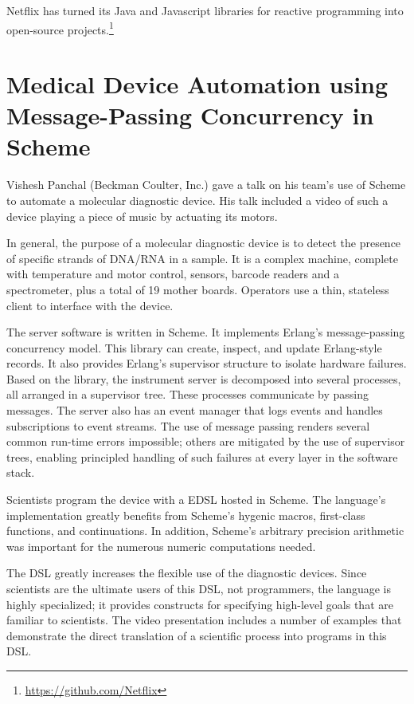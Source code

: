 \documentclass{jfp1}
\begin{document}
Netflix has turned its Java and Javascript libraries for reactive
programming into open-source
projects.\footnote{\url{https://github.com/Netflix}}

\section{Medical Device Automation using Message-Passing Concurrency in Scheme}


Vishesh Panchal (Beckman Coulter, Inc.) gave a talk on his team's use of
Scheme to automate a molecular diagnostic device. His talk included a
video of such a device playing a piece of music by actuating its motors.

In general, the purpose of a molecular diagnostic device is to detect the
presence of specific strands of DNA/RNA in a sample. It is a complex
machine, complete with temperature and motor control, sensors, barcode
readers and a spectrometer, plus a total of 19 mother boards. Operators
use a thin, stateless client to interface with the device.  

The server software is written in Scheme. It implements Erlang's
message-passing concurrency model. This library can create, inspect, and
update Erlang-style records. It also provides Erlang's supervisor
structure to isolate hardware failures. Based on the library, the
instrument server is decomposed into several processes, all arranged in a
supervisor tree. These processes communicate by passing messages. The
server also has an event manager that logs events and handles
subscriptions to event streams. The use of message passing renders several
common run-time errors impossible; others are mitigated by the use of
supervisor trees, enabling principled handling of such failures at every
layer in the software stack.

Scientists program the device with a EDSL hosted in Scheme. The language's
implementation greatly benefits from Scheme's hygenic macros, first-class
functions, and continuations. In addition, Scheme's arbitrary precision
arithmetic was important for the numerous numeric computations needed.

The DSL greatly increases the flexible use of the diagnostic devices.
Since scientists are the ultimate users of this DSL, not programmers, the
language is highly specialized; it provides constructs for specifying
high-level goals that are familiar to scientists. The video presentation
includes a number of examples that demonstrate the direct translation of a
scientific process into programs in this DSL. 
\end{document}
